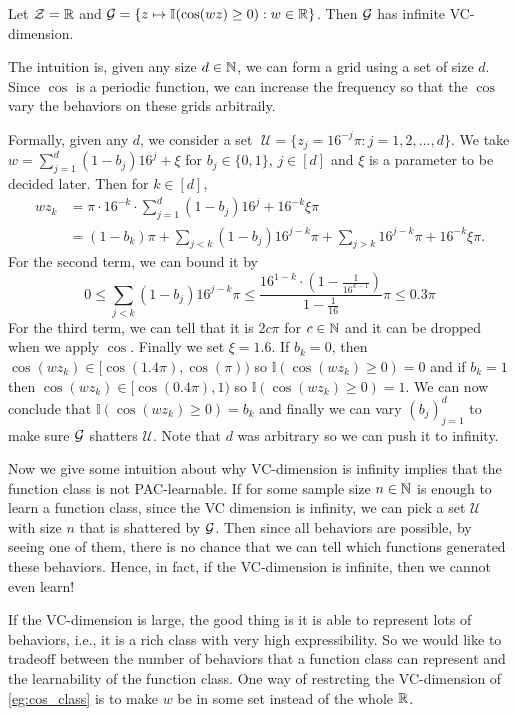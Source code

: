 \documentclass[twoside]{article}
\newcommand{\I}{\mathbb{I}}
\newcommand{\cU}{\mathcal{U}}
\begin{document}
\begin{example}\label{eg:cos_class}
    Let $\mathcal{Z}=\mathbb{R}$ and $\cG=\{z\mapsto \I(\cos (wz)\ge 0):w\in \R\}$. Then $\mathcal{G}$ has infinite VC-dimension. 

    The intuition is, given any size $d\in \mathbb{N}$, we can form a grid using a set of size $d$. Since $\cos$ is a periodic function, we can increase the frequency so that the $\cos$ vary the behaviors on these grids arbitraily.

    Formally,
    given any $d$, we consider a set  $\;\cU=\{z_j=16^{-j}\pi:j=1,2,...,d\}$. We take $w=\sum_{j=1}^d (1-b_j)16^{j}+\xi$ for $b_j\in \{0,1\}$, $j\in [d]$ and $\xi$ is a parameter to be decided later. Then for $k\in[d]$, 
    \begin{align*}
        wz_k &= \pi \cdot 16^{-k}\cdot \sum_{j=1}^d (1-b_j)16^j+16^{-k}\xi\pi\\
        &=(1-b_k)\pi +\sum_{j<k}(1-b_j)16^{j-k}\pi + \sum_{j>k}16^{j-k}\pi +16^{-k}\xi\pi.
    \end{align*}
    For the second term, we can bound it by 
    \[0\le \sum_{j<k}(1-b_j)16^{j-k}\pi\le \frac{16^{1-k}\cdot \left(1-\frac{1}{16^{k-1}}\right)}{1-\frac{1}{16}}\pi\le 0.3\pi\]
    For the third term, we can tell that it is $2c\pi$ for $c\in \mathbb{N}$ and it can be dropped when we apply $\cos$.
    Finally we set $\xi=1.6$. If $b_k=0$, then $\cos(wz_k)\in [\cos(1.4\pi), \cos(\pi))$ so $\mathbb I(\cos(wz_k)\ge 0)=0$ and if $b_k=1$ then $\cos(wz_k)\in [\cos(0.4\pi), 1)$ so $\mathbb I(\cos(wz_k)\ge 0)=1$. We can now conclude that $\mathbb I(\cos(wz_k)\ge 0)=b_k$ and finally we can vary $(b_j)_{j=1}^d$ to make sure $\mathcal{G}$ shatters $\cU$. Note that $d$ was arbitrary so we can push it to infinity. 
\end{example}
Now we give some intuition about why VC-dimension is infinity implies that the function class is not PAC-learnable. If for some sample size $n\in \mathbb{N}$ is enough to learn a function class, since the VC dimension is infinity, we can pick a set $\cU$ with size $n$ that is shattered by $\mathcal{G}$. Then since all behaviors are possible, by seeing one of them, there is no chance that we can tell which functions generated these behaviors. Hence, in fact, if the VC-dimension is infinite, then we cannot even learn!

If the VC-dimension is large, the good thing is it is able to represent lots of behaviors, i.e., it is a rich class with very high expressibility. So we would like to tradeoff between the number of behaviors that a function class can represent and the learnability of the function class. One way of restrcting the VC-dimension of \cref{eg:cos_class} is to make $w$ be in some set instead of the whole $\mathbb{R}$.
\end{document}

